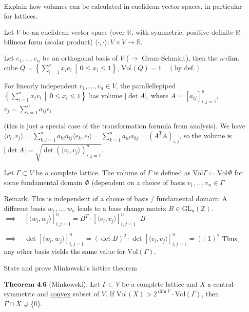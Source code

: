 Explain how volumes can be calculated in euclidean vector spaces, in particular for lattices.

Let \( V \) be an euclidean vector space (over \( \mathbb{R} \), with symmetric, positive definite \( \mathbb{R} \)-bilinear form (scalar product) 
\( \langle \cdot, \cdot \rangle : V \times V \to \mathbb{R} \).

Let \( e_1, \ldots, e_n \) be an orthogonal basis of \( V \) (\(\to\) Gram-Schmidt), then the \( n \)-dim. cube
\( Q = \left\{ \sum_{i=1}^{n} x_i e_i \, \middle| \, 0 \leq x_i \leq 1 \right\} \), \quad \(\text{Vol}(Q) = 1 \quad (\text{by def.})\)

For linearly independent \( v_1, \ldots, v_n \in V \), the parallellepiped 
\( \left\{ \sum_{i=1}^{n} x_i v_i \, \middle| \, 0 \leq x_i \leq 1 \right\} \) has volume \( |\det A| \), where
\( A = [a_{ij}]_{i,j=1}^{n} \), \quad \( v_j = \sum_{i=1}^{n} a_{ij} e_i \)

(this is just a special case of the transformation formula from analysis). We have
\( \langle v_i, v_j \rangle = \sum_{k,l=1}^{n} a_{ki} a_{lj} \langle e_k, e_l \rangle = \sum_{k=1}^{n} a_{ki} a_{kj} = (A^T A)_{i,j} \),
so the volume is \( |\det A| = \sqrt{\det \left( \langle v_i, v_j \rangle \right)_{i,j=1}^{n}} \).

Let \( Γ ⊂ V \) be a complete lattice. The volume of \( \Gamma \) is defined as
\( \text{Vol} \Gamma \coloneqq \text{Vol} \Phi \) for some fundamental domain \( \Phi \) 
(dependent on a choice of basis \( v_1, \dots, v_n \in \Gamma \)

Remark. This is independent of a choice of basis / fundamental domain: 
A different basis \( w_1, \ldots, w_n \) leads to a base change matrix \( B \in \text{GL}_n(\mathbb{Z}) \).
\(
\implies \quad \left[ \langle w_i, w_j \rangle \right]_{i,j=1}^{n} = B^T \cdot \left[ \langle v_i, v_j \rangle \right]_{i,j=1}^{n} \cdot B
\)

\(
\implies \quad \det \left[ \langle w_i, w_j \rangle \right]_{i,j=1}^{n} = (\det B)^2 \cdot \det \left[ \langle v_i, v_j \rangle \right]_{i,j=1}^{n} = ( \pm 1)^2
\)
Thus, any other basis yields the same value for \(\text{Vol}(\Gamma)\).


State and prove Minkowski's lattice theorem

\( \textbf{Theorem 4.6} \) (Minkowski).
Let \(\Gamma \subset V\) be a complete lattice and \(X\) a central-symmetric and \underline{convex} subset of \(V\).
If \(\text{Vol}(X) > 2^{\dim V} \cdot \text{Vol}(\Gamma)\), then \(\Gamma \cap X \supsetneq \{0\}\).

